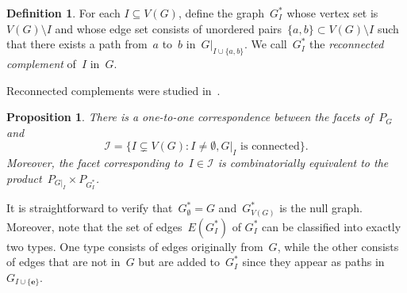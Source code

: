\documentclass[10pt]{amsart}
\theoremstyle{plain}
\newtheorem{proposition}[theorem]{Proposition}
\numberwithin{equation}{section}
\theoremstyle{definition}
\newtheorem{definition}[theorem]{Definition}
\newcommand{\cI}{\mathcal{I}}
\newcommand{\edge}{\mathbf{e}}
\begin{document}
\begin{definition}
    For each $I \subseteq V(G)$, define the graph~$G^\ast_I$ whose vertex set is~$V(G) \setminus I$ and whose edge set consists of unordered pairs~$\{a,b\} \subset V(G) \setminus I$ such that there exists a path from~$a$ to~$b$ in~$G|_{I \cup \{a,b\}}$.  
    We call~$G^\ast_I$ the \emph{reconnected complement} of~$I$ in~$G$.
\end{definition}

Reconnected complements were studied in~\cite{Carr-Devadoss2006,Buchstaber-Panov2015,Vladimir-Adam-Denis_2024}.
\begin{proposition}\cite{Carr-Devadoss2006}\label{prop:carr}
    There is a one-to-one correspondence between the facets of~$P_G$ and
    $$
    \cI = \{I \subsetneq V(G) \colon I \neq \emptyset, G\vert_I \text{ is connected}\}.
    $$
    Moreover, the facet corresponding to~$I \in \cI$ is combinatorially equivalent to the product~$P_{G\vert_I} \times P_{G_I^\ast}$.
\end{proposition}

It is straightforward to verify that~$G^\ast_{\emptyset} = G$ and~$G^\ast_{V(G)}$ is the null graph.
Moreover, note that the set of edges~$E(G^\ast_{I})$ of $G^\ast_{I}$ can be classified into exactly two types.
One type consists of edges originally from~$G$, while the other consists of edges that are not in~$G$ but are added to~$G^\ast_I$ since they appear as paths in~$G_{I \cup \{\edge\}}$.
\end{document}
